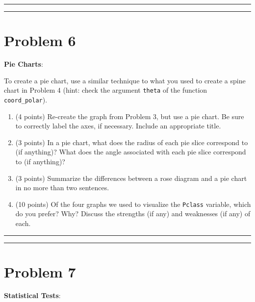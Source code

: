 \documentclass[]{article}
\begin{document}
\begin{center}\rule{0.5\linewidth}{\linethickness}\end{center}

\begin{center}\rule{0.5\linewidth}{\linethickness}\end{center}

\hypertarget{problem-6}{%
\section{Problem 6}\label{problem-6}}

\textbf{Pie Charts}:

To create a pie chart, use a similar technique to what you used to
create a spine chart in Problem 4 (hint: check the argument
\texttt{theta} of the function \texttt{coord\_polar}).

\begin{enumerate}
\def\labelenumi{\alph{enumi}.}
\item
  (4 points) Re-create the graph from Problem 3, but use a pie chart. Be
  sure to correctly label the axes, if necessary. Include an appropriate
  title.
\item
  (3 points) In a pie chart, what does the radius of each pie slice
  correspond to (if anything)? What does the angle associated with each
  pie slice correspond to (if anything)?
\item
  (3 points) Summarize the differences between a rose diagram and a pie
  chart in no more than two sentences.
\item
  (10 points) Of the four graphs we used to visualize the
  \texttt{Pclass} variable, which do you prefer? Why? Discuss the
  strengths (if any) and weaknesses (if any) of each.
\end{enumerate}

\begin{center}\rule{0.5\linewidth}{\linethickness}\end{center}

\begin{center}\rule{0.5\linewidth}{\linethickness}\end{center}

\hypertarget{problem-7}{%
\section{Problem 7}\label{problem-7}}

\textbf{Statistical Tests}:
\end{document}
